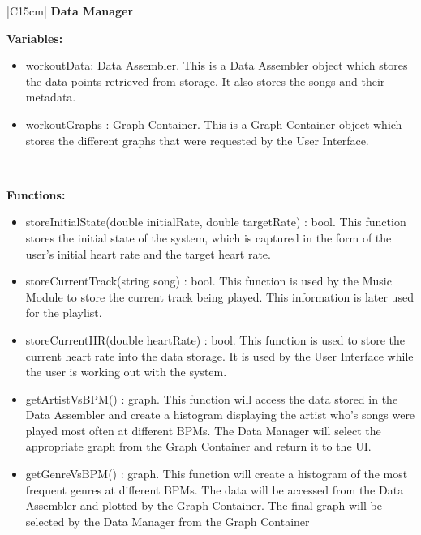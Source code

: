 \begin{center}
    \begin{tabular}{|C{15cm}|}
        \hline
            \textbf{Data Manager}\\
        \hline
            \begin{flushleft}
                \textbf{Variables:} \\
            \end{flushleft}
                \begin{itemize}
                    \item workoutData: Data Assembler. This is a Data Assembler object which stores the data points retrieved from storage. It also stores the songs and their metadata.
                    \item workoutGraphs : Graph Container. This is a Graph Container object which stores the different graphs that were requested by the User Interface.
                \end{itemize} \\
            \hline
            \begin{flushleft}
                \textbf{Functions:} \\
            \end{flushleft}
                \begin{itemize}
                    \item storeInitialState(double initialRate, double targetRate) : bool. This function stores the initial state of the system, which is captured in the form of the user's initial heart rate and the target heart rate.
                    \item storeCurrentTrack(string song) : bool. This function is used by the Music Module to store the current track being played. This information is later used for the playlist.
                    \item storeCurrentHR(double heartRate) : bool. This function is used to store the current heart rate into the data storage. It is used by the User Interface while the user is working out with the system.
                    \item getArtistVsBPM() : graph. This function will access the data stored in the Data Assembler and create a histogram displaying the artist who's songs were played most often at different BPMs. The Data Manager will select the appropriate graph from the Graph Container and return it to the UI.
                    \item getGenreVsBPM() : graph. This function will create a histogram of the most frequent genres at different BPMs. The data will be accessed from the Data Assembler and plotted by the Graph Container. The final graph will be selected by the Data Manager from the Graph Container

\end{itemize}
\end{tabular}
\end{center}
